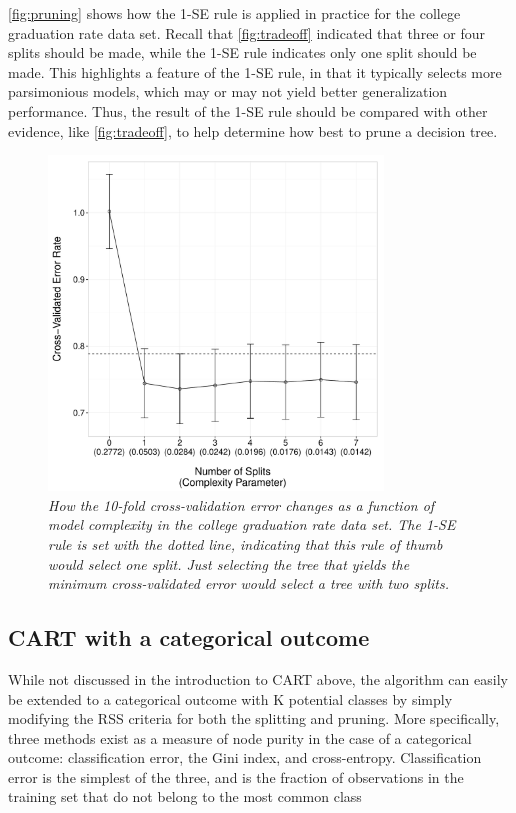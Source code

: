 	\autoref{fig:pruning} shows how the 1-SE rule is applied in practice for the college graduation rate data set. Recall that \autoref{fig:tradeoff} indicated that three or four splits should be made, while the 1-SE rule indicates only one split should be made. This highlights a feature of the 1-SE rule, in that it typically selects more parsimonious models, which may or may not yield better generalization performance. Thus, the result of the 1-SE rule should be compared with other evidence, like \autoref{fig:tradeoff}, to help determine how best to prune a decision tree. 


\begin{figure}[h]
  \centering
  \includegraphics[width=3.5in]{Figures/Chapter02/cp_plot.pdf}
  \caption[Using cost-complexity pruning on the graduation rate data set.]{\textit{How the 10-fold cross-validation error changes as a function of model complexity in the college graduation rate data set. The 1-SE rule is set with the dotted line, indicating that this rule of thumb would select one split. Just selecting the tree that yields the minimum cross-validated error would select a tree with two splits.}}
  \label{fig:pruning}
\end{figure}



\subsection{CART with a categorical outcome}

	While not discussed in the introduction to CART above, the algorithm can easily be extended to a categorical outcome with K potential classes by simply modifying the RSS criteria for both the splitting and pruning. More specifically, three methods exist as a measure of node purity in the case of a categorical outcome: classification error, the Gini index, and cross-entropy. Classification error is the simplest of the three, and is the fraction of observations in the training set that do not belong to the most common class



